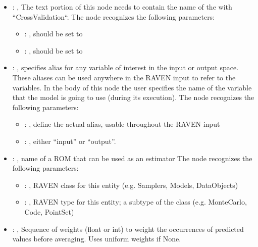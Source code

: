 \begin{itemize}
    \item {}: , 
      The text portion of this node needs to contain the name of the  with
               ``CrossValidation``.
      The  node recognizes the following parameters:
        \begin{itemize}
          \item {}: , 
            should be set to 
          \item {}: , 
            should be set to 
      \end{itemize}

    \item {}: , 
      specifies alias for         any variable of interest in the input or output space. These
      aliases can be used anywhere in the RAVEN input to         refer to the variables. In the body
      of this node the user specifies the name of the variable that the model is going to use
      (during its execution).
      The  node recognizes the following parameters:
        \begin{itemize}
          \item {}: , 
            define the actual alias, usable throughout the RAVEN input
          \item {}: , 
            either ``input'' or ``output''.
      \end{itemize}

    \item {}: , 
      name of a ROM that can be used as an estimator
      The  node recognizes the following parameters:
        \begin{itemize}
          \item {}: , 
            RAVEN class for this entity (e.g. Samplers, Models, DataObjects)
          \item {}: , 
            RAVEN type for this entity; a subtype of the class (e.g. MonteCarlo, Code, PointSet)
      \end{itemize}

    \item {}: , 
      Sequence of weights (float or int) to weight the occurrences of predicted
      values before averaging. Uses uniform weights if None.
  \end{itemize}


